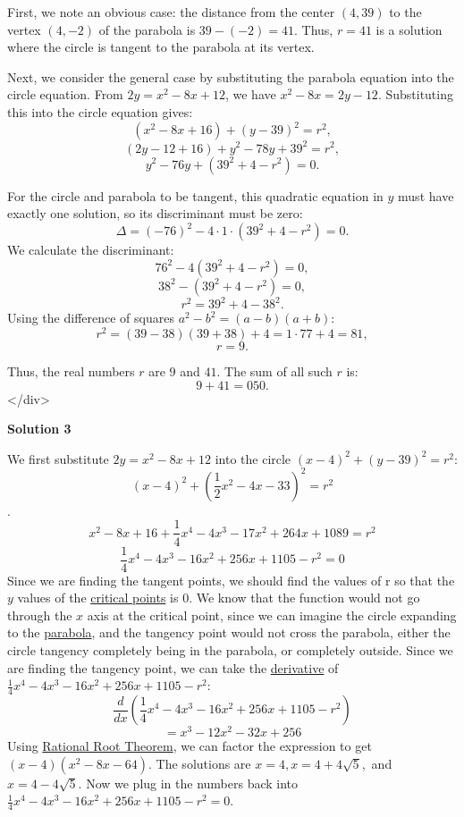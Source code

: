 \begin{enumerate}
 First, we note an obvious case: the distance from the center \((4, 39)\) to the vertex \((4, -2)\) of the parabola is \(39 - (-2) = 41\). Thus, \(r = 41\) is a solution where the circle is tangent to the parabola at its vertex.

 Next, we consider the general case by substituting the parabola equation into the circle equation. From \(2y = x^2 - 8x + 12\), we have \(x^2 - 8x = 2y - 12\). Substituting this into the circle equation gives:
 \[(x^2 - 8x + 16) + (y - 39)^2 = r^2,\]
 \[(2y - 12 + 16) + y^2 - 78y + 39^2 = r^2,\]
 \[y^2 - 76y + (39^2 + 4 - r^2) = 0.\]

 For the circle and parabola to be tangent, this quadratic equation in \(y\) must have exactly one solution, so its discriminant must be zero:
 \[\Delta = (-76)^2 - 4 \cdot 1 \cdot (39^2 + 4 - r^2) = 0.\]We calculate the discriminant:
 \[76^2 - 4(39^2 + 4 - r^2) = 0,\]
 \[38^2 - (39^2 + 4 - r^2) = 0,\]
 \[r^2 = 39^2 + 4 - 38^2.\]Using the difference of squares \(a^2 - b^2 = (a - b)(a + b)\):
 \[r^2 = (39 - 38)(39 + 38) + 4 = 1 \cdot 77 + 4 = 81,\]
 \[r = 9.\]

 Thus, the real numbers \(r\) are \(9\) and \(41\). The sum of all such \(r\) is:
 \[9 + 41 = \boxed{050}.\]
</div>



\textbf{Solution 3}

We first substitute $2y = x^2 - 8x + 12$ into the circle $(x-4)^2 + (y-39)^2 = r^2$:  
 \[(x-4)^2 + (\frac{1}{2}x^2-4x-33)^2 = r^2\]. 
 \[x^2-8x+16 + \frac{1}{4}x^4-4x^3-17x^2+264x+1089 = r^2\]
 \[\frac{1}{4}x^4-4x^3-16x^2+256x+1105-r^2=0\]Since we are finding the tangent points, we should find the values of r so that the $y$ values of the \href{https://artofproblemsolving.com/wiki/index.php?title=Critical\_point}{critical points} is $0$. We know that the function would not go through the $x$ axis at the critical point, since we can imagine the circle expanding to the \href{https://artofproblemsolving.com/wiki/index.php?title=Parabola}{parabola}, and the tangency point would not cross the parabola, either the circle tangency completely being in the parabola, or completely outside. Since we are finding the tangency point, we can take the \href{https://artofproblemsolving.com/wiki/index.php?title=Derivative}{derivative} of $\frac{1}{4}x^4-4x^3-16x^2+256x+1105-r^2$:
 \[\frac{d}{dx}(\frac{1}{4}x^4-4x^3-16x^2+256x+1105-r^2)\]
 \[=x^3-12x^2-32x+256\]Using \href{https://artofproblemsolving.com/wiki/index.php?title=Rational\_Root\_Theorem}{Rational Root Theorem}, we can factor the expression to get $(x-4)(x^2-8x-64)$. The solutions are $x=4,x=4+4\sqrt5,$ and $x=4-4\sqrt5$. Now we plug in the numbers back into $\frac{1}{4}x^4-4x^3-16x^2+256x+1105-r^2=0$.


\end{enumerate}
